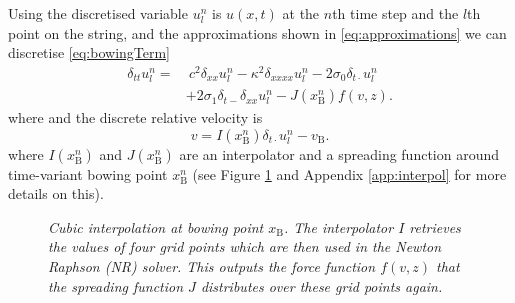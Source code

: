 \documentclass[twoside,a4paper]{article}
\begin{document}
Using the discretised variable $u_l^n$ is $u(x,t)$ at the $n$th time step and the $l$th point on the string, and the approximations shown in \eqref{eq:approximations} we can discretise \eqref{eq:bowingTerm}
\begin{equation}
  \begin{aligned}
    \label{eq:FDS}
        \delta_{tt} u_l^n = &\: c^2 \delta_{xx} u_l^n -\kappa^2\delta_{xxxx} u_l^n - 2\sigma_0\delta_{t\cdot} u_l^n
        \\ 
        &+ 2\sigma_1\delta_{t-}\delta_{xx}u_l^n - J(x_\text{B}^n)f(v, z).
    \end{aligned}
\end{equation}
where
and the discrete relative velocity is
\begin{equation}\label{eq:discRelVel}
v = I(x_\text{B}^n)\delta_{t\cdot}u_l^n -  v_\text{B}.
\end{equation}
where $I(x_\text{B}^n)$ and $J(x_\text{B}^n)$ are an interpolator and a spreading function around time-variant bowing point $x_\text{B}^n$ (see Figure \ref{fig:interpol} and Appendix \ref{app:interpol} for more details on this).
\begin{figure}[h]
    \centering
    \caption{\it Cubic interpolation at bowing point $x_\text{B}$. The interpolator $I$ retrieves the values of four grid points which are then used in the Newton Raphson (NR) solver. This outputs the force function $f(v,z)$ that the spreading function $J$ distributes over these grid points again.}
    \label{fig:interpol}
\end{figure}
\end{document}
